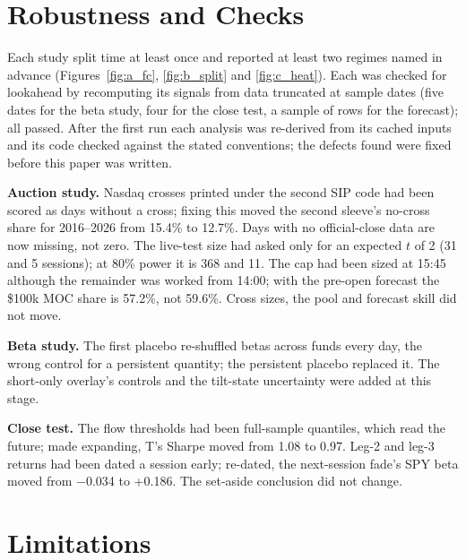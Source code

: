 \documentclass[10pt, a4paper, twocolumn]{article}
\begin{document}
\section{Robustness and Checks}
\label{sec:robust}

Each study split time at least once and reported at least two regimes named in advance (Figures~\ref{fig:a_fc}, \ref{fig:b_split} and \ref{fig:c_heat}). Each was checked for lookahead by recomputing its signals from data truncated at sample dates (five dates for the beta study, four for the close test, a sample of rows for the forecast); all passed. After the first run each analysis was re-derived from its cached inputs and its code checked against the stated conventions; the defects found were fixed before this paper was written.

\textbf{Auction study.} Nasdaq crosses printed under the second SIP code had been scored as days without a cross; fixing this moved the second sleeve's no-cross share for 2016--2026 from 15.4\% to 12.7\%. Days with no official-close data are now missing, not zero. The live-test size had asked only for an expected $t$ of 2 (31 and 5 sessions); at 80\% power it is 368 and 11. The cap had been sized at 15:45 although the remainder was worked from 14:00; with the pre-open forecast the \$100k MOC share is 57.2\%, not 59.6\%. Cross sizes, the pool and forecast skill did not move.

\textbf{Beta study.} The first placebo re-shuffled betas across funds every day, the wrong control for a persistent quantity; the persistent placebo replaced it. The short-only overlay's controls and the tilt-state uncertainty were added at this stage.

\textbf{Close test.} The flow thresholds had been full-sample quantiles, which read the future; made expanding, T's Sharpe moved from 1.08 to 0.97. Leg-2 and leg-3 returns had been dated a session early; re-dated, the next-session fade's SPY beta moved from $-$0.034 to +0.186. The set-aside conclusion did not change.

\section{Limitations}
\label{sec:limits}
\end{document}
